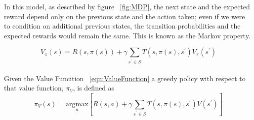 In this model, as described by figure ~\ref{fig:MDP}, the next state and the expected reward depend only on the previous state and the action taken; even if we were to condition on additional previous states, the transition probabilities and the expected rewards would remain the same. This is known as the Markov property.

\begin{equation}
	V_{\pi}(s) = R(s,\pi(s)) + \gamma \sum_{s^\prime \in S} T(s, \pi(s), s^\prime) V_{\pi}(s^\prime)
	\label{eqn:ValueFunction}
\end{equation}
\\
Given the Value Funcition ~\ref{eqn:ValueFunction} a greedy policy with respect to that value function, $\pi_V$, is defined as 
\begin{equation}
	\pi_V(s) = \underset{a}{\mathrm{argmax}}\left[R(s,a) + \gamma \sum_{s^\prime \in S} T(s, \pi(s), s^\prime) V(s^\prime) \right]
\end{equation}